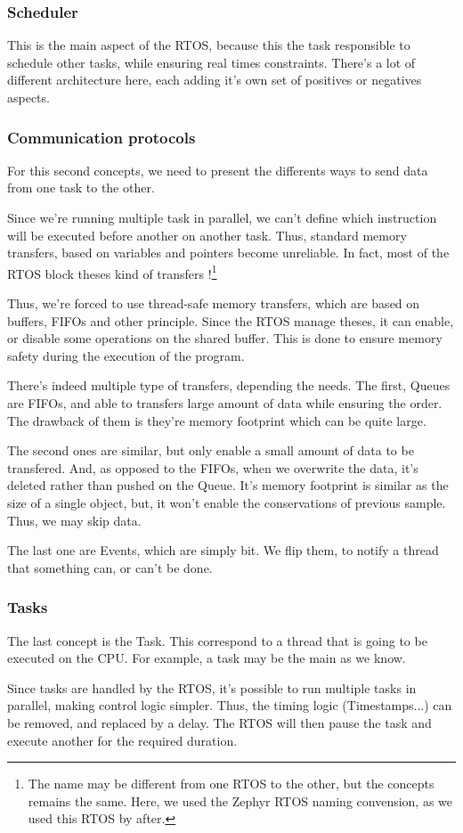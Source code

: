 \subsubsection{Scheduler}
This is the main aspect of the RTOS, because this the task responsible to schedule other tasks,
while ensuring real times constraints. There's a lot of different architecture here, each adding
it's own set of positives or negatives aspects.

\subsubsection{Communication protocols}
For this second concepts, we need to present the differents ways to send data from one task to the
other.

Since we're running multiple task in parallel, we can't define which instruction will be executed
before another on another task. Thus, standard memory transfers, based on variables and pointers
become unreliable.
In fact, most of the RTOS block theses kind of transfers !\footnote{
    The name may be different from one RTOS to the other, but the concepts remains the same.
    Here, we used the Zephyr RTOS naming convension, as we used this RTOS by after.
}

Thus, we're forced to use thread-safe memory transfers, which are based on buffers, FIFOs and other
principle. Since the RTOS manage theses, it can enable, or disable some operations on the shared buffer.
This is done to ensure memory safety during the execution of the program.

There's indeed multiple type of transfers, depending the needs.
The first, Queues are FIFOs, and able to transfers large amount of data while ensuring the order. The
drawback of them is they're memory footprint which can be quite large.

The second ones are similar, but only enable a small amount of data to be transfered. And, as opposed
to the FIFOs, when we overwrite the data, it's deleted rather than pushed on the Queue. It's memory
footprint is similar as the size of a single object, but, it won't enable the conservations of previous
sample. Thus, we may skip data.

The last one are Events, which are simply bit. We flip them, to notify a thread that something can, or
can't be done.

\subsubsection{Tasks}
The last concept is the Task. This correspond to a thread that is going to be executed on the CPU.
For example, a task may be the main as we know.

Since tasks are handled by the RTOS, it's possible to run multiple tasks in parallel, making control
logic simpler. Thus, the timing logic (Timestamps...) can be removed, and replaced by a delay. The RTOS
will then pause the task and execute another for the required duration.